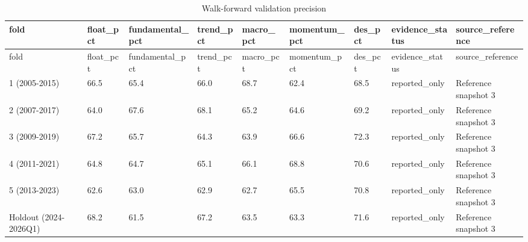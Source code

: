 \begin{landscape}
\begin{longtable}{lllllllll}
\caption{Walk-forward validation precision}\label{tab:evaluation_3} \\
\toprule
fold & float\_pct & fundamental\_pct & trend\_pct & macro\_pct & momentum\_pct & des\_pct & evidence\_status & source\_reference \\
\midrule
\endfirsthead
\toprule
fold & float\_pct & fundamental\_pct & trend\_pct & macro\_pct & momentum\_pct & des\_pct & evidence\_status & source\_reference \\
\midrule
\endhead
1 (2005-2015) & 66.5 & 65.4 & 66.0 & 68.7 & 62.4 & 68.5 & reported\_only & Reference snapshot 3 \\
2 (2007-2017) & 64.0 & 67.6 & 68.1 & 65.2 & 64.6 & 69.2 & reported\_only & Reference snapshot 3 \\
3 (2009-2019) & 67.2 & 65.7 & 64.3 & 63.9 & 66.6 & 72.3 & reported\_only & Reference snapshot 3 \\
4 (2011-2021) & 64.8 & 64.7 & 65.1 & 66.1 & 68.8 & 70.6 & reported\_only & Reference snapshot 3 \\
5 (2013-2023) & 62.6 & 63.0 & 62.9 & 62.7 & 65.5 & 70.8 & reported\_only & Reference snapshot 3 \\
Holdout (2024-2026Q1) & 68.2 & 61.5 & 67.2 & 63.5 & 63.3 & 71.6 & reported\_only & Reference snapshot 3 \\
\bottomrule
\end{longtable}
\end{landscape}
